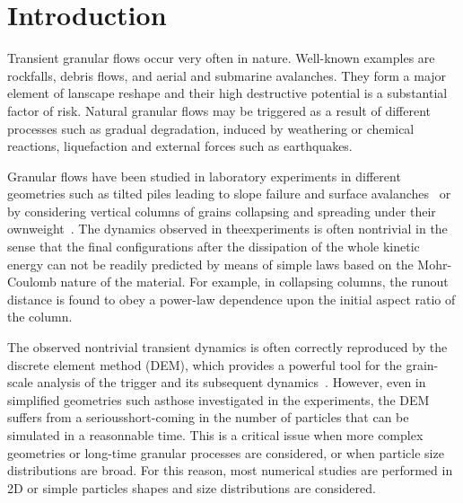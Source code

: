 \documentclass[3p,times,procedia,number]{elsarticle}
\begin{document}



\section{Introduction}
\label{sec:intro}
Transient granular flows occur very often in nature. Well-known examples are
rockfalls, debris flows, and aerial and submarine avalanches. They form a major
element of lanscape reshape and their high destructive potential is a
substantial factor of risk. Natural granular flows may be triggered as a result
of different processes such as gradual degradation, induced by weathering or
chemical reactions, liquefaction and external forces such as earthquakes.          

Granular flows have been studied in laboratory experiments in different 
geometries such as tilted piles leading to slope failure and surface
avalanches~\citep{Mutabaruka2015,Legros2002, Iverson1997} or by considering
vertical columns of grains collapsing and spreading under their
ownweight~\citep{Lajeunesse2004, Lajeunesse2005}. The dynamics observed in
theexperiments is often nontrivial in the sense that the final configurations
after the dissipation of the whole kinetic energy can not be readily predicted
by means of simple laws based on the Mohr-Coulomb nature of the material. For
example, in collapsing columns, the runout distance is found to obey a
power-law dependence upon the initial aspect ratio of the column. 

The observed nontrivial transient dynamics is often correctly reproduced by the
discrete element method (DEM), which provides a powerful tool for the
grain-scale analysis of the trigger and its subsequent
dynamics~\citep{Staron2005, Staron2009}. However, even in simplified geometries
such asthose investigated in the experiments, the DEM suffers from a
seriousshort-coming in the number of particles that can be simulated in a
reasonnable time. This is a critical issue when more complex geometries or
long-time granular processes are considered, or when particle size
distributions are broad. For this reason, most numerical studies are performed
in 2D or simple particles shapes and size distributions are considered. 
\end{document}

